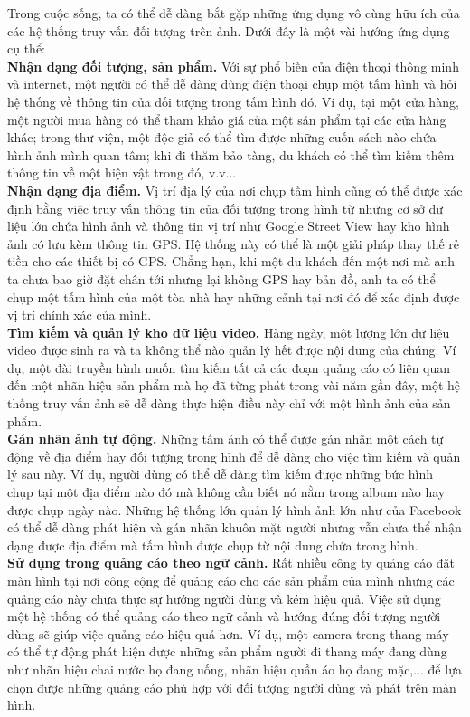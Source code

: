 Trong cuộc sống, ta có thể dễ dàng bắt gặp những ứng dụng vô cùng hữu ích của các hệ thống truy vấn đối tượng trên ảnh. Dưới đây là một vài hướng ứng dụng cụ thể:\\
\textbf{Nhận dạng đối tượng, sản phẩm.} Với sự phổ biến của điện thoại thông minh và internet, một người có thể dễ dàng dùng điện thoại chụp một tấm hình và hỏi hệ thống về thông tin của đối tượng trong tấm hình đó. Ví dụ, tại một cửa hàng, một người mua hàng có thể tham khảo giá của một sản phẩm tại các cửa hàng khác; trong thư viện, một độc giả có thể tìm được những cuốn sách nào chứa hình ảnh mình quan tâm; khi đi thăm bảo tàng, du khách có thể tìm kiếm thêm thông tin về một hiện vật trong đó, v.v...\\
\textbf{Nhận dạng địa điểm.} Vị trí địa lý của nơi chụp tấm hình cũng có thể được xác định bằng việc truy vấn thông tin của đối tượng trong hình từ những cơ sở dữ liệu lớn chứa hình ảnh và thông tin vị trí như Google Street View hay kho hình ảnh có lưu kèm thông tin GPS. Hệ thống này có thể là một giải pháp thay thế rẻ tiền cho các thiết bị có GPS. Chẳng hạn, khi một du khách đến một nơi mà anh ta chưa bao giờ đặt chân tới nhưng lại không GPS hay bản đồ, anh ta có thể chụp một tấm hình của một tòa nhà hay những cảnh tại nơi đó để xác định được vị trí chính xác của mình.\\
\textbf{Tìm kiếm và quản lý kho dữ liệu video.} Hàng ngày, một lượng lớn dữ liệu video được sinh ra và ta không thể nào quản lý hết được nội dung của chúng. Ví dụ, một đài truyền hình muốn tìm kiếm tất cả các đoạn quảng cáo có liên quan đến một nhãn hiệu sản phẩm mà họ đã từng phát trong vài năm gần đây, một hệ thống truy vấn ảnh sẽ dễ dàng thực hiện điều này chỉ với một hình ảnh của sản phẩm.\\
\textbf{Gán nhãn ảnh tự động.} Những tấm ảnh có thể được gán nhãn một cách tự động về địa điểm hay đối tượng trong hình để dễ dàng cho việc tìm kiếm và quản lý sau này. Ví dụ, người dùng có thể dễ dàng tìm kiếm được những bức hình chụp tại một địa điểm nào đó mà không cần biết nó nằm trong album nào hay được chụp ngày nào. Những hệ thống lớn quản lý hình ảnh lớn như của Facebook có thể dễ dàng phát hiện và gán nhãn khuôn mặt người nhưng vẫn chưa thể nhận dạng được địa điểm mà tấm hình được chụp từ nội dung chứa trong hình.\\
\textbf{Sử dụng trong quảng cáo theo ngữ cảnh.} Rất nhiều công ty quảng cáo đặt màn hình tại nơi công cộng để quảng cáo cho các sản phẩm của mình nhưng các quảng cáo này chưa thực sự hướng người dùng và kém hiệu quả. Việc sử dụng một hệ thống có thể quảng cáo theo ngữ cảnh và hướng đúng đối tượng người dùng sẽ giúp việc quảng cáo hiệu quả hơn. Ví dụ, một camera trong thang máy có thể tự động phát hiện được những sản phẩm người đi thang máy đang dùng như nhãn hiệu chai nước họ đang uống, nhãn hiệu quần áo họ đang mặc,... để lựa chọn được những quảng cáo phù hợp với đối tượng người dùng và phát trên màn hình.\\
